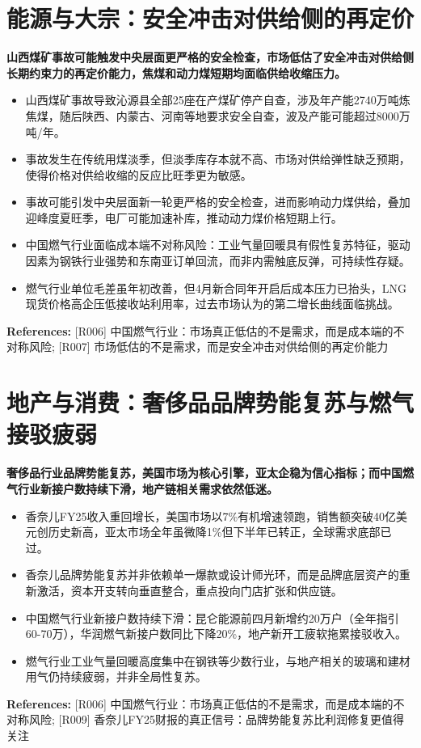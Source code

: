 \documentclass[11pt]{ctexart}
\begin{document}
\section{能源与大宗：安全冲击对供给侧的再定价}
\textbf{山西煤矿事故可能触发中央层面更严格的安全检查，市场低估了安全冲击对供给侧长期约束力的再定价能力，焦煤和动力煤短期均面临供给收缩压力。}

\begin{itemize}
  \item 山西煤矿事故导致沁源县全部25座在产煤矿停产自查，涉及年产能2740万吨炼焦煤，随后陕西、内蒙古、河南等地要求安全自查，波及产能可能超过8000万吨/年。
  \item 事故发生在传统用煤淡季，但淡季库存本就不高、市场对供给弹性缺乏预期，使得价格对供给收缩的反应比旺季更为敏感。
  \item 事故可能引发中央层面新一轮更严格的安全检查，进而影响动力煤供给，叠加迎峰度夏旺季，电厂可能加速补库，推动动力煤价格短期上行。
  \item 中国燃气行业面临成本端不对称风险：工业气量回暖具有假性复苏特征，驱动因素为钢铁行业强势和东南亚订单回流，而非内需触底反弹，可持续性存疑。
  \item 燃气行业单位毛差虽年初改善，但4月新合同年开启后成本压力已抬头，LNG现货价格高企压低接收站利用率，过去市场认为的第二增长曲线面临挑战。
\end{itemize}
{\small\color{refgray}\textbf{References:} [R006] 中国燃气行业：市场真正低估的不是需求，而是成本端的不对称风险; [R007] 市场低估的不是需求，而是安全冲击对供给侧的再定价能力}

\section{地产与消费：奢侈品品牌势能复苏与燃气接驳疲弱}
\textbf{奢侈品行业品牌势能复苏，美国市场为核心引擎，亚太企稳为信心指标；而中国燃气行业新接户数持续下滑，地产链相关需求依然低迷。}

\begin{itemize}
  \item 香奈儿FY25收入重回增长，美国市场以7\%有机增速领跑，销售额突破40亿美元创历史新高，亚太市场全年虽微降1\%但下半年已转正，全球需求底部已过。
  \item 香奈儿品牌势能复苏并非依赖单一爆款或设计师光环，而是品牌底层资产的重新激活，资本开支转向垂直整合，重点投向门店扩张和供应链。
  \item 中国燃气行业新接户数持续下滑：昆仑能源前四月新增约20万户（全年指引60-70万），华润燃气新接户数同比下降20\%，地产新开工疲软拖累接驳收入。
  \item 燃气行业工业气量回暖高度集中在钢铁等少数行业，与地产相关的玻璃和建材用气仍持续疲弱，并非全局性复苏。
\end{itemize}
{\small\color{refgray}\textbf{References:} [R006] 中国燃气行业：市场真正低估的不是需求，而是成本端的不对称风险; [R009] 香奈儿FY25财报的真正信号：品牌势能复苏比利润修复更值得关注}
\end{document}
